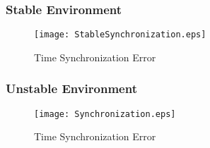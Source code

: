\documentclass[Main]{subfiles}
\begin{document}
		\subsubsection{Stable Environment} %
		\label{sub:stable_environment}
			
			\begin{figure}[H]
				\centering
				\texttt{[image: StableSynchronization.eps]}
				\caption{Time Synchronization Error}
				\label{fig:Synchronization}
			\end{figure}


		\subsubsection{Unstable Environment} %
		\label{sub:unstable_environment}
			
			\begin{figure}[H]
				\centering
				\texttt{[image: Synchronization.eps]}
				\caption{Time Synchronization Error}
				\label{fig:Synchronization}
			\end{figure}

	

\end{document}
